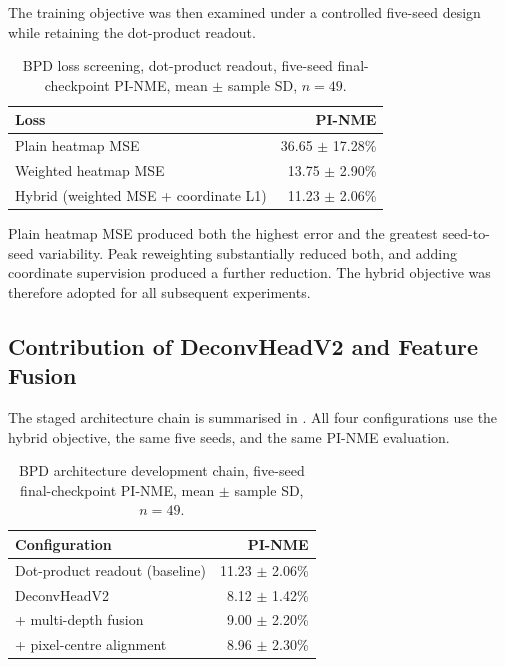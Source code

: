 The training objective was then examined under a controlled five-seed
design while retaining the dot-product readout.

\begin{table}[htbp]
  \centering
  \caption{BPD loss screening, dot-product readout, five-seed
    final-checkpoint PI-NME, mean $\pm$ sample SD, $n=49$.}
  \label{tab:bpd-loss}
  \begin{tabular}{@{}lr@{}}
    \toprule
    Loss & PI-NME \\
    \midrule
    Plain heatmap MSE
      & 36.65 $\pm$ 17.28\% \\
    Weighted heatmap MSE
      & 13.75 $\pm$ 2.90\% \\
    Hybrid (weighted MSE + coordinate L1)
      & 11.23 $\pm$ 2.06\% \\
    \bottomrule
  \end{tabular}
\end{table}

Plain heatmap MSE produced both the highest error and the greatest
seed-to-seed variability. Peak reweighting substantially reduced both,
and adding coordinate supervision produced a further reduction. The
hybrid objective was therefore adopted for all subsequent
experiments.


\subsection{Contribution of DeconvHeadV2 and Feature Fusion}
\label{sec:results-bpd-ablation}

The staged architecture chain is summarised in
. All four
configurations use the hybrid objective, the same five seeds, and the
same PI-NME evaluation.

\begin{table}[htbp]
  \centering
  \caption{BPD architecture development chain, five-seed
    final-checkpoint PI-NME, mean $\pm$ sample SD, $n=49$.}
  \label{tab:bpd-progression}
  \begin{tabular}{@{}lr@{}}
    \toprule
    Configuration & PI-NME \\
    \midrule
    Dot-product readout (baseline)
      & 11.23 $\pm$ 2.06\% \\
    DeconvHeadV2
      & 8.12 $\pm$ 1.42\% \\
    \quad + multi-depth fusion
      & 9.00 $\pm$ 2.20\% \\
    \quad + pixel-centre alignment
      & 8.96 $\pm$ 2.30\% \\
    \bottomrule
  \end{tabular}
\end{table}

